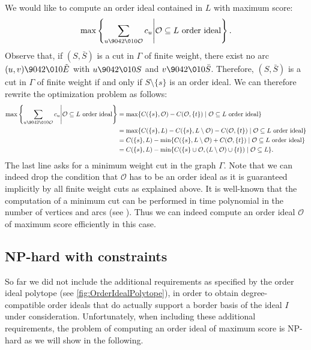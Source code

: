 \documentclass[11pt,oneside,english]{amsart}
\makeatletter
\numberwithin{equation}{section}
\numberwithin{figure}{section}
\theoremstyle{plain}
\theoremstyle{definition}
\theoremstyle{definition}
\theoremstyle{remark}
\theoremstyle{plain}
\theoremstyle{plain}
\theoremstyle{plain}
\theoremstyle{problem@}
\newcounter{problem}
\makeatother
\begin{document}
We would like to compute an order ideal contained in $L$ with maximum score:
\[ \max \left\{ \sum_{u {\9042\010} {\mathcal{O}}} c_u \middle| {\mathcal{O}} \subseteq L \text{ order ideal} \right\}.\] 
Observe that, if $(S, \bar S)$ is a cut in $\Gamma$ of finite weight,
there exist no arc $(u,v) {\9042\010} \tilde E$ with $u {\9042\010} S$ and $v {\9042\010} \bar S$. Therefore, $(S, \bar S)$ is a cut in $\Gamma$ of finite weight if and only if $S \setminus \{s\}$ is an order ideal. We can therefore rewrite the optimization problem as follows:
\begin{equation*}
  \begin{split}
    \max \left\{ \sum_{u {\9042\010} {\mathcal{O}}} c_u \middle| {\mathcal{O}} \subseteq L \text{ order
        ideal} \right\} &= \max \{ C(\{s\},{\mathcal{O}} ) - C({\mathcal{O}}, \{t\}) \mid
    {\mathcal{O}} \subseteq L \text{ order ideal}\} \\
    &= \max \{ C(\{s\}, L ) - C(\{s\},L \setminus {\mathcal{O}} ) - C({\mathcal{O}}, \{t\}) \mid
    {\mathcal{O}} \subseteq L \text{ order ideal} \} \\
    &= C(\{s\}, L ) - \min \{ C(\{s\},L \setminus {\mathcal{O}} ) + C({\mathcal{O}}, \{t\}) \mid
    {\mathcal{O}} \subseteq L \text{ order ideal} \}  \\
    &= C(\{s\}, L ) - \min \{ C(\{s\} \cup {\mathcal{O}} , (L \setminus {\mathcal{O}}) \cup \{t\}
    ) \mid {\mathcal{O}} \subseteq L \}.
  \end{split}
\end{equation*}
The last line asks for a minimum weight cut in the graph $\Gamma$. Note that we can indeed drop the condition that ${\mathcal{O}}$ has to be an order ideal as it is guaranteed implicitly by all finite weight cuts as explained above. It is well-known that the computation of a minimum cut can be performed in time polynomial in the number of vertices and arcs (see \cite{wolsey1999integer}). Thus we can indeed compute an order ideal ${\mathcal{O}}$ of maximum score efficiently in this case.

\subsection{{\textrm{NP}\xspace}-hard with constraints}
\label{sec:np-hard-constraints}

So far we did not include the additional requirements as specified by the
order ideal polytope (see \autoref{fig:OrderIdealPolytope}), in order to
obtain degree-compatible order ideals that do actually support a border basis
of the ideal $I$ under consideration. Unfortunately, when including these
additional requirements, the problem of computing an order ideal of maximum
score is {\textrm{NP}\xspace}-hard as we will show in the following.
\end{document}
